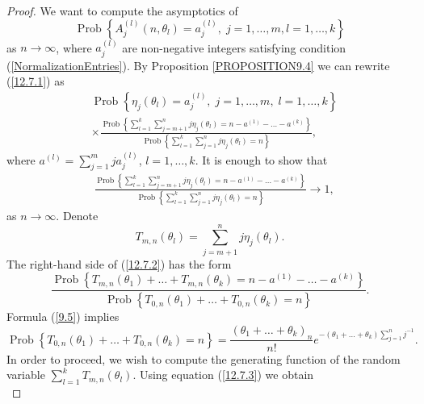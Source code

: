 \documentclass[12pt]{amsart}
\theoremstyle{definition}
\numberwithin{equation}{section}
\DeclareMathOperator{\Prob}{Prob}
\begin{document}
\begin{proof}
We want to compute the asymptotics of
\begin{equation}\label{12.7.1}
\Prob\left\{A_j^{(l)}(n,\theta_l)=a_j^{(l)},\; j=1,\ldots,m, l=1,\ldots,k\right\}
\end{equation}
as $n\rightarrow\infty$, where $a_j^{(l)}$ are
non-negative integers satisfying condition (\ref{NormalizationEntries}). By Proposition \ref{PROPOSITION9.4} we can
rewrite  (\ref{12.7.1}) as
\begin{equation}\label{12.7.2}
\begin{split}
&\Prob\left\{\eta_j(\theta_l)
=a_j^{(l)},\; j=1,\ldots,m,\; l=1,\ldots,k\right\}\\
&\times\frac{\Prob\left\{\sum\limits_{l=1}^k\sum\limits_{j=m+1}^nj\eta_j(\theta_l)=n-a^{(1)}-\ldots-a^{(k)}\right\}}{\Prob\left\{\sum\limits_{l=1}^k\sum\limits_{j=1}^nj\eta_j(\theta_l)=n\right\}},
\end{split}
\end{equation}
where $a^{(l)}=\sum\limits_{j=1}^mja_j^{(l)}$, $l=1,\ldots,k$.
It is enough to show that
\begin{equation}
\begin{split}
&\frac{\Prob\left\{\sum\limits_{l=1}^k\sum\limits_{j=m+1}^nj\eta_j(\theta_l)=n-a^{(1)}-\ldots-a^{(k)}\right\}}{\Prob\left\{\sum\limits_{l=1}^k\sum\limits_{j=1}^nj\eta_j(\theta_l)=n\right\}}\longrightarrow 1,
\end{split}
\end{equation}
as $n\rightarrow\infty$. Denote
\begin{equation}\label{12.7.3}
T_{m,n}(\theta_l)=\sum\limits_{j=m+1}^nj\eta_j(\theta_l).
\end{equation}
The right-hand side of (\ref{12.7.2}) has the form
\begin{equation}\label{12.7.4}
\frac{\Prob\left\{T_{m,n}(\theta_1)+\ldots+T_{m,n}(\theta_k)=n-a^{(1)}-\ldots-a^{(k)}\right\}}{\Prob\left\{T_{0,n}(\theta_1)+\ldots+T_{0,n}(\theta_k)=n\right\}}.
\end{equation}
Formula (\ref{9.5}) implies
\begin{equation}
\Prob\left\{T_{0,n}(\theta_1)+\ldots+T_{0,n}(\theta_k)=n\right\}=
\frac{(\theta_1+\ldots+\theta_k)_n}{n!}e^{-(\theta_1+\ldots+\theta_k)\sum_{j=1}^nj^{-1}}.
\end{equation}
In order to proceed, we wish to compute the generating function of the random variable $\sum\limits_{l=1}^kT_{m,n}(\theta_l)$. Using equation (\ref{12.7.3})
we obtain
\begin{equation}\label{9T}

\end{equation}
\end{proof}
\end{document}
